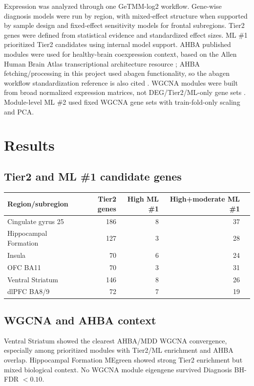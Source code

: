 \documentclass[11pt]{article}
\begin{document}
Expression was analyzed through one GeTMM-log2 workflow. Gene-wise diagnosis models were run by region, with mixed-effect structure when supported by sample design and fixed-effect sensitivity models for frontal subregions. Tier2 genes were defined from statistical evidence and standardized effect sizes. ML \#1 prioritized Tier2 candidates using internal model support. AHBA published modules were used for healthy-brain coexpression context, based on the Allen Human Brain Atlas transcriptional architecture resource \citep{Hawrylycz2015}; AHBA fetching/processing in this project used abagen functionality, so the abagen workflow standardization reference is also cited \citep{Markello2021}. WGCNA modules were built from broad normalized expression matrices, not DEG/Tier2/ML-only gene sets \citep{Langfelder2008}. Module-level ML \#2 used fixed WGCNA gene sets with train-fold-only scaling and PCA.

\section{Results}

\subsection{Tier2 and ML \#1 candidate genes}

\begin{center}
\begin{tabular}{lrrrr}
\toprule
Region/subregion & Tier2 genes & High ML \#1 & High+moderate ML \#1 \\
\midrule
Cingulate gyrus 25 & 186 & 8 & 37 \\
Hippocampal Formation & 127 & 3 & 28 \\
Insula & 70 & 6 & 24 \\
OFC BA11 & 70 & 3 & 31 \\
Ventral Striatum & 146 & 8 & 26 \\
dlPFC BA8/9 & 72 & 7 & 19 \\
\bottomrule
\end{tabular}
\end{center}

\subsection{WGCNA and AHBA context}

Ventral Striatum showed the clearest AHBA/MDD WGCNA convergence, especially among prioritized modules with Tier2/ML enrichment and AHBA overlap. Hippocampal Formation MEgreen showed strong Tier2 enrichment but mixed biological context. No WGCNA module eigengene survived Diagnosis BH-FDR $<0.10$.
\end{document}
